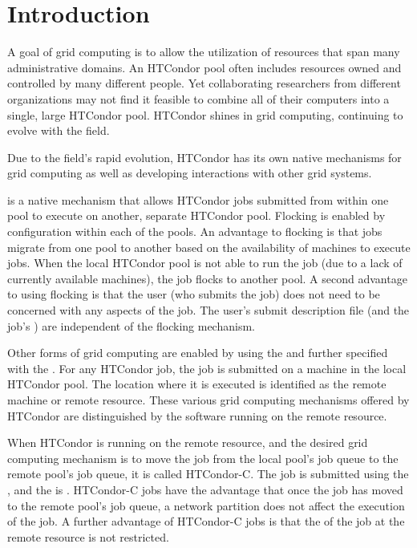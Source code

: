 \section{Introduction}\label{sec:grids-intro}

A goal of grid computing is to allow the utilization of resources that
span many administrative domains.
An HTCondor pool often includes
resources owned and controlled by many different people.
Yet collaborating researchers from different organizations
may not find it feasible to combine all of their computers
into a single, large HTCondor pool.
HTCondor shines in grid computing,
continuing to evolve with the field.

Due to the field's rapid evolution, HTCondor has its own native mechanisms
for grid computing as well as developing interactions 
with other grid systems.


 is a native mechanism that allows HTCondor jobs
submitted from within one pool
to execute on another, separate HTCondor pool.
Flocking is enabled by configuration within each of the pools.
An advantage to flocking is that jobs migrate from one
pool to another based on the availability of machines to
execute jobs.
When the local HTCondor pool is not able to run the job
(due to a lack of currently available machines),
the job flocks to another pool.
A second advantage to using flocking is that the user
(who submits the job) does not need to be concerned with
any aspects of the job.
The user's submit description file (and the job's )
are independent of the flocking mechanism.

Other forms of grid computing are enabled by using
the  
and further specified with the .
For any HTCondor job, 
the job is submitted on a machine in the local HTCondor pool.
The location where it is executed is identified as the remote machine
or remote resource.
These various grid computing mechanisms offered by
HTCondor are distinguished by the software
running on the remote resource.

When HTCondor is running on the remote resource,
and the desired grid computing mechanism 
is to move the job from the local pool's job queue
to the remote pool's job queue,
it is called HTCondor-C.
The job is submitted using the 
, 
and the  is .
HTCondor-C jobs have the advantage that once the job has moved
to the remote pool's job queue,
a network partition does not affect the execution of the job.
A further advantage of HTCondor-C jobs is that the 
of the job at the remote resource is not restricted. 

